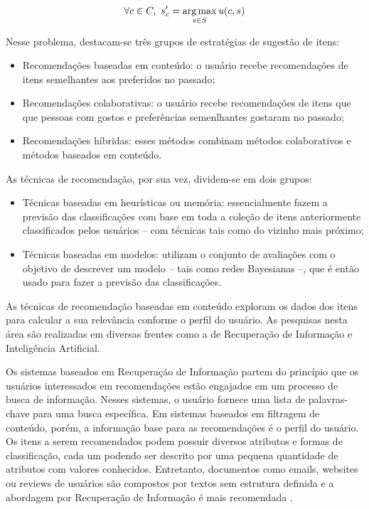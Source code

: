 $$
\forall c \in C, ~ s^\prime_c = \operatorname*{arg\,max}_{s \in S}{u(c,s)}
$$ 

Nesse problema, destacam-se três grupos de estratégias de sugestão de itens: 
\begin{itemize}
\item Recomendações baseadas em conteúdo: o usuário recebe recomendações de itens semelhantes aos preferidos no passado; 
\item Recomendações colaborativas: o usuário recebe recomendações de itens que que pessoas com gostos e preferências semenlhantes gostaram no passado;
\item Recomendações híbridas: esses métodos combinam métodos colaborativos e métodos baseados em conteúdo.  
\end{itemize}

As técnicas de recomendação, por sua vez, dividem-se em dois grupos:

\begin{itemize}
\item Técnicas baseadas em heurísticas ou memória: essencialmente fazem a previsão das classificações com base em toda a coleção de itens anteriormente classificados pelos usuários -- com técnicas tais como do vizinho mais próximo;
\item Técnicas baseadas em modelos: utilizam o conjunto de avaliações com o objetivo de descrever um modelo -- tais como redes Bayesianas --, que é então usado para fazer a previsão das classificações.
\end{itemize}

As técnicas de recomendação baseadas em conteúdo exploram os dados dos itens para calcular a sua relevância conforme o perfil do usuário. As pesquisas nesta área são realizadas em diversas frentes como a de Recuperação de Informação e Inteligência Artificial.

Os sistemas baseados em Recuperação de Informação partem do princípio que os usuários interessados em recomendações estão engajados em um processo de busca de informação. Nesses sistemas, o usuário fornece uma lista de palavras-chave para uma busca específica. Em sistemas baseados em filtragem de conteúdo, porém, a informação base para as recomendações é o perfil do usuário. Os itens a serem recomendados podem possuir diversos atributos e formas de classificação, cada um podendo ser descrito por uma pequena quantidade de atributos com valores conhecidos. Entretanto, documentos como emails, websites ou reviews de usuários são compostos por textos sem estrutura definida e a abordagem por Recuperação de Informação é mais recomendada \cite{schafer2001commerce}.

